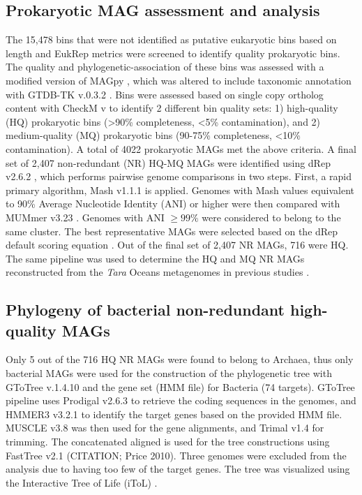 \documentclass[12pt]{article}
\numberwithin{equation}{section}
\begin{document}
\subsection*{Prokaryotic MAG assessment and analysis} 
The 15,478 bins that were not identified as putative eukaryotic bins based on length and EukRep metrics were screened to identify quality prokaryotic bins. The quality and phylogenetic-association of these bins was assessed with a modified version of MAGpy \citep{Stewart2019MAGpy}, which was altered to include taxonomic annotation with GTDB-TK v.0.3.2 \citep{Chaumeil_2019}. Bins were assessed based on single copy ortholog content with CheckM v \citep{Parks2015CheckM} to identify 2 different bin quality sets: 1) high-quality (HQ) prokaryotic bins (>90\% completeness, <5\% contamination), and 2) medium-quality (MQ) prokaryotic bins (90-75\% completeness, <10\% contamination). A total of 4022 prokaryotic MAGs met the above criteria. A final set of 2,407 non-redundant (NR) HQ-MQ MAGs were identified using dRep v2.6.2 \citep{Olm_2017}, which performs pairwise genome comparisons in two steps. First, a rapid primary algorithm, Mash v1.1.1 \citep{Ondov_2016} is applied. Genomes with Mash values equivalent to 90\% Average Nucleotide Identity (ANI) or higher were then compared with MUMmer v3.23 \citep{Mar_ais_2018}. Genomes with ANI $\geq99\%$ were considered to belong to the same cluster. The best representative MAGs were selected based on the dRep default scoring equation \citep{Olm_2017}. Out of the final set of 2,407 NR MAGs, 716 were HQ. The same pipeline was used to determine the HQ and MQ NR MAGs reconstructed from the \textit{Tara} Oceans metagenomes in previous studies \citep{Tully2018reconstruction, Parks2017Recovery, Delmont2018Nitrogen-fixing}. 

\subsection*{Phylogeny of bacterial non-redundant high-quality MAGs}
Only 5 out of the 716 HQ NR MAGs were found to belong to Archaea, thus only bacterial MAGs were used for the construction of the phylogenetic tree with GToTree v.1.4.10 \citep{Lee_2019} and the gene set (HMM file) for Bacteria (74 targets). GToTree pipeline uses Prodigal v2.6.3 \citep{Hyatt_2010} to retrieve the coding sequences in the genomes, and HMMER3 v3.2.1 \citep{Eddy_2011} to identify the target genes based on the provided HMM file. MUSCLE v3.8 \citep{Edgar_2004} was then used for the gene alignments, and Trimal v1.4  \citep{Capella_Gutierrez_2009} for trimming. The concatenated aligned is used for the tree constructions using FastTree v2.1 (CITATION; Price 2010). Three genomes were excluded from the analysis due to having too few of the target genes. The tree was visualized using the Interactive Tree of Life (iToL) \citep{Letunic2016Interactive}.
\end{document}
